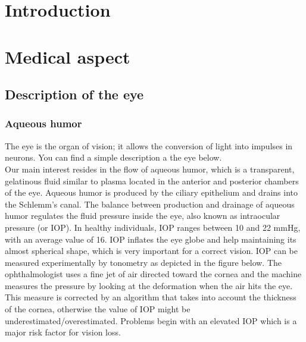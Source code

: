 \documentclass[english,12pt]{article}
\begin{document}
\vskip25mm
\section{Introduction}\label{S1}
\section{Medical aspect}\label{s2}
\subsection{Description of the eye}
\subsubsection{Aqueous humor }
The eye is the organ of vision; it allows the conversion of light into impulses in neurons. You can find a simple description a the eye below.\\
Our main interest resides in the flow of aqueous humor, which is a transparent, gelatinous fluid similar to plasma located in the anterior and posterior chambers of the eye. Aqueous humor is produced by the ciliary epithelium and drains into the Schlemm's canal. The balance between production and drainage of aqueous humor regulates the fluid pressure inside the eye, also known as intraocular pressure (or IOP). 
In healthy individuals, IOP ranges between 10 and 22 mmHg, with an average value of 16. 
IOP inflates the eye globe and help maintaining its almost spherical shape, which is very important for a correct vision. 
IOP can be measured experimentally by tonometry as depicted in the figure below.
 The ophthalmologist uses a fine jet of air directed toward the cornea and the machine measures the pressure by looking at the deformation when the air hits the eye. This measure is corrected by an algorithm that takes into account the thickness of the cornea, otherwise the value of IOP might be underestimated/overestimated.
Problems begin with an elevated IOP which is a major risk factor for vision loss.
\end{document}
